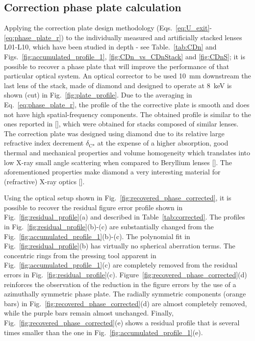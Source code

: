 \begin{refsection}
\subsection{Correction phase plate calculation}\label{sec:cpp_calculation}

Applying the correction plate design methodology (Eqs.~\ref{eq:U_exit}-\ref{eq:phase_plate_r}) to the individually measured and artificially stacked lenses L01-L10, which have been studied in depth - see Table.~\ref{tab:CDn} and Figs.~\ref{fig:accumulated_profile_1}, \ref{fig:CDn_vs_CDnStack} and \ref{fig:CDnS}; it is possible to recover a phase plate that will improve the performance of that particular optical system. An optical corrector to be used 10~mm downstream the last lens of the stack, made of diamond and designed to operate at 8~keV is shown (cut) in Fig.~\ref{fig:plate_profile}. Due to the averaging in Eq.~\ref{eq:phase_plate_r}, the profile of the the corrective plate is smooth and does not have high spatial-frequency components. The obtained profile is similar to the ones reported in [\cite{Seiboth2017,Seiboth2018,Seiboth2020}], which were obtained for stacks composed of similar lenses. The correction plate was designed using diamond due to its relative large refractive index decrement $\delta_\text{C*}$ at the expense of a higher absorption, good thermal and mechanical properties and volume homogeneity which translates into low X-ray small angle scattering when compared to Beryllium lenses [\cite{Chubar2020}]. The aforementioned properties make diamond a very interesting material for (refractive) X-ray optics [\cite{Polikarpov2016b,ShvydKo2017}].

Using the optical setup shown in Fig.~\ref{fig:recovered_phase_corrected}, it is possible to recover the residual figure error profile shown in Fig.~\ref{fig:residual_profile}(a) and described in Table~\ref{tab:corrected}. The profiles in Fig.~\ref{fig:residual_profile}(b)-(c) are substantially changed from the Fig.~\ref{fig:accumulated_profile_1}(b)-(c). The polynomial fit in Fig.~\ref{fig:residual_profile}(b) has virtually no spherical aberration terms. The concentric rings from the pressing tool apparent in Fig.~\ref{fig:accumulated_profile_1}(c) are completely removed from the residual errors in Fig.~\ref{fig:residual_profile}(c). Figure~\ref{fig:recovered_phase_corrected}(d) reinforces the observation of the reduction in the figure errors by the use of a azimuthally symmetric phase plate. The radially symmetric components (orange bars) in Fig.~\ref{fig:recovered_phase_corrected}(d) are almost completely removed, while the purple bars remain almost unchanged. Finally, Fig.~\ref{fig:recovered_phase_corrected}(e) shows a residual profile that is several times smaller than the one in Fig.~\ref{fig:accumulated_profile_1}(e).



\end{refsection}
